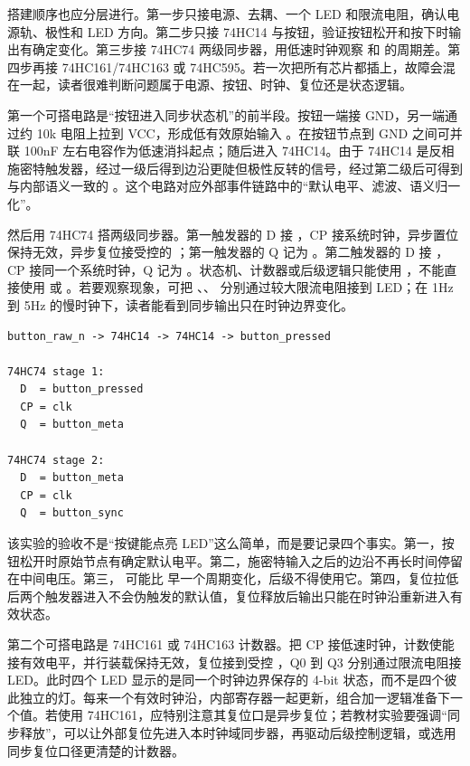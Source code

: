 搭建顺序也应分层进行。第一步只接电源、去耦、一个 LED 和限流电阻，确认电源轨、极性和 LED 方向。第二步只接 74HC14 与按钮，验证按钮松开和按下时输出有确定变化。第三步接 74HC74 两级同步器，用低速时钟观察  和  的周期差。第四步再接 74HC161/74HC163 或 74HC595。若一次把所有芯片都插上，故障会混在一起，读者很难判断问题属于电源、按钮、时钟、复位还是状态逻辑。

第一个可搭电路是“按钮进入同步状态机”的前半段。按钮一端接 GND，另一端通过约 10k 电阻上拉到 VCC，形成低有效原始输入 。在按钮节点到 GND 之间可并联 100nF 左右电容作为低速消抖起点；随后进入 74HC14。由于 74HC14 是反相施密特触发器，经过一级后得到边沿更陡但极性反转的信号，经过第二级后可得到与内部语义一致的 。这个电路对应外部事件链路中的“默认电平、滤波、语义归一化”。

然后用 74HC74 搭两级同步器。第一触发器的 D 接 ，CP 接系统时钟，异步置位保持无效，异步复位接受控的 ；第一触发器的 Q 记为 。第二触发器的 D 接 ，CP 接同一个系统时钟，Q 记为 。状态机、计数器或后级逻辑只能使用 ，不能直接使用  或 。若要观察现象，可把 、、 分别通过较大限流电阻接到 LED；在 1Hz 到 5Hz 的慢时钟下，读者能看到同步输出只在时钟边界变化。

\begin{lstlisting}
button_raw_n -> 74HC14 -> 74HC14 -> button_pressed

74HC74 stage 1:
  D  = button_pressed
  CP = clk
  Q  = button_meta

74HC74 stage 2:
  D  = button_meta
  CP = clk
  Q  = button_sync
\end{lstlisting}

该实验的验收不是“按键能点亮 LED”这么简单，而是要记录四个事实。第一，按钮松开时原始节点有确定默认电平。第二，施密特输入之后的边沿不再长时间停留在中间电压。第三， 可能比  早一个周期变化，后级不得使用它。第四，复位拉低后两个触发器进入不会伪触发的默认值，复位释放后输出只能在时钟沿重新进入有效状态。

第二个可搭电路是 74HC161 或 74HC163 计数器。把 CP 接低速时钟，计数使能接有效电平，并行装载保持无效，复位接到受控 ，Q0 到 Q3 分别通过限流电阻接 LED。此时四个 LED 显示的是同一个时钟边界保存的 4-bit 状态，而不是四个彼此独立的灯。每来一个有效时钟沿，内部寄存器一起更新，组合加一逻辑准备下一个值。若使用 74HC161，应特别注意其复位口是异步复位；若教材实验要强调“同步释放”，可以让外部复位先进入本时钟域同步器，再驱动后级控制逻辑，或选用同步复位口径更清楚的计数器。

